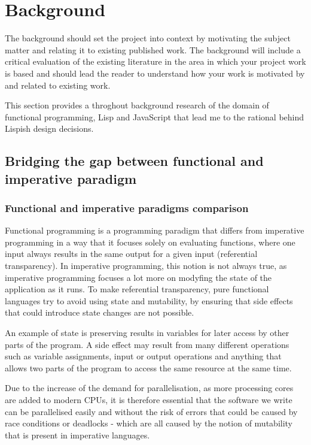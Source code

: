 \chapter{Background}
The background should set the project into context by motivating the subject matter and relating it to existing published work. The background will include a critical evaluation of the existing literature in the area in which your project work is based and should lead the reader to understand how your work is motivated by and related to existing work.

This section provides a throghout background research of the domain of functional programming, Lisp and JavaScript that lead me to the rational behind Lispish design decisions.

\section{Bridging the gap between functional and imperative paradigm}

\subsection{Functional and imperative paradigms comparison}
Functional programming is a programming paradigm that differs from imperative programming in a way that it focuses solely on evaluating functions, where one input always results in the same output for a given input (referential transparency). In imperative programming, this notion is not always true, as imperative programming focuses a lot more on modyfing the state of the application as it runs. To make referential transparency, pure functional languages try to avoid using state and mutability, by ensuring that side effects that could introduce state changes are not possible.

An example of state is preserving results in variables for later access by other parts of the program. A side effect may result from many different operations such as variable assignments, input or output operations and anything that allows two parts of the program to access the same resource at the same time.

Due to the increase of the demand for parallelisation, as more processing cores are added to modern CPUs, it is therefore essential that the software we write can be parallelised easily and without the risk of errors that could be caused by race conditions or deadlocks - which are all caused by the notion of mutability that is present in imperative languages.

